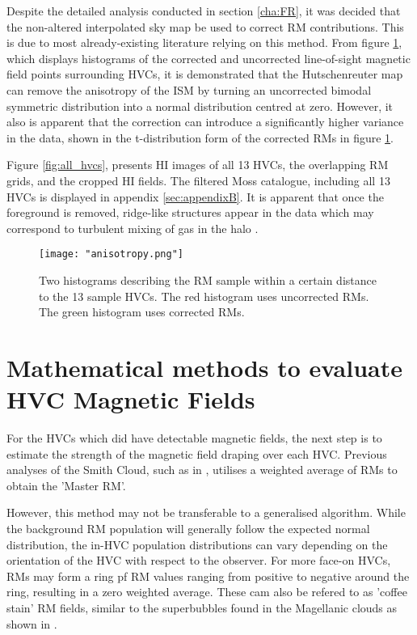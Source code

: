 Despite the detailed analysis conducted in section \ref{cha:FR}, it was decided that the non-altered interpolated sky map be used to correct RM contributions. This is due to most already-existing literature relying on this method. From figure \ref{fig:anisotropy}, which displays histograms of the corrected and uncorrected line-of-sight magnetic field points surrounding HVCs, it is demonstrated that the Hutschenreuter map can remove the anisotropy of the ISM by turning an uncorrected bimodal symmetric distribution into a normal distribution centred at zero. However, it also is apparent that the correction can introduce a significantly higher variance in the data, shown in the t-distribution form of the corrected RMs in figure \ref{fig:anisotropy}.

Figure \ref{fig:all_hvcs}, presents HI images of all 13 HVCs, the overlapping RM grids, and the cropped HI fields. The filtered Moss catalogue, including all 13 HVCs is displayed in appendix \ref{sec:appendixB}. It is apparent that once the foreground is removed, ridge-like structures appear in the data which may correspond to turbulent mixing of gas in the halo \citep{ID69, ID30}.

\begin{figure}
    \texttt{[image: "anisotropy.png"]}
    \centering
    \caption{Two histograms describing the RM sample within a certain distance to the 13 sample HVCs. The red histogram uses uncorrected RMs. The green histogram uses corrected RMs.}
    \label{fig:anisotropy}
\end{figure}

%

\section{Mathematical methods to evaluate HVC Magnetic Fields}
\label{sec:evaluation}

For the HVCs which did have detectable magnetic fields, the next step is to estimate the strength of the magnetic field draping over each HVC. Previous analyses of the Smith Cloud, such as in \cite{ID5, ID26}, utilises a weighted average of RMs to obtain the 'Master RM'. 


However, this method may not be transferable to a generalised algorithm. While the background RM population will generally follow the expected normal distribution, the in-HVC population distributions can vary depending on the orientation of the HVC with respect to the observer. For more face-on HVCs, RMs may form a ring pf RM values ranging from positive to negative around the ring, resulting in a zero weighted average. These cam also be refered to as 'coffee stain' RM fields, similar to the superbubbles found in the Magellanic clouds as shown in \cite{ID75}.


